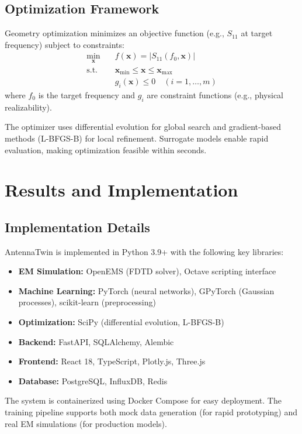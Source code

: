 \documentclass[conference]{IEEEtran}
\begin{document}
\subsection{Optimization Framework}
Geometry optimization minimizes an objective function (e.g., $S_{11}$ at target frequency) subject to constraints:
\begin{equation}
\begin{aligned}
\min_{\mathbf{x}} \quad & f(\mathbf{x}) = |S_{11}(f_0, \mathbf{x})| \\
\text{s.t.} \quad & \mathbf{x}_{\text{min}} \leq \mathbf{x} \leq \mathbf{x}_{\text{max}} \\
& g_i(\mathbf{x}) \leq 0 \quad (i = 1, \ldots, m)
\end{aligned}
\end{equation}
where $f_0$ is the target frequency and $g_i$ are constraint functions (e.g., physical realizability).

The optimizer uses differential evolution for global search and gradient-based methods (L-BFGS-B) for local refinement. Surrogate models enable rapid evaluation, making optimization feasible within seconds.

\section{Results and Implementation}

\subsection{Implementation Details}
AntennaTwin is implemented in Python 3.9+ with the following key libraries:
\begin{itemize}
    \item \textbf{EM Simulation:} OpenEMS (FDTD solver), Octave scripting interface
    \item \textbf{Machine Learning:} PyTorch (neural networks), GPyTorch (Gaussian processes), scikit-learn (preprocessing)
    \item \textbf{Optimization:} SciPy (differential evolution, L-BFGS-B)
    \item \textbf{Backend:} FastAPI, SQLAlchemy, Alembic
    \item \textbf{Frontend:} React 18, TypeScript, Plotly.js, Three.js
    \item \textbf{Database:} PostgreSQL, InfluxDB, Redis
\end{itemize}

The system is containerized using Docker Compose for easy deployment. The training pipeline supports both mock data generation (for rapid prototyping) and real EM simulations (for production models).
\end{document}
